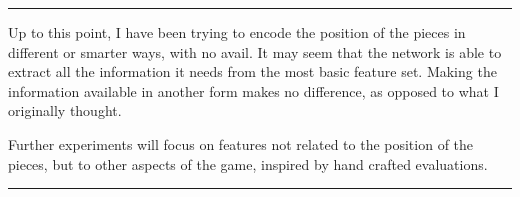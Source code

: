 



\noindent\rule{\textwidth}{1pt}

\vspace{0.2cm}
Up to this point, I have been trying to encode the position of the pieces in different or smarter ways, with no avail. It may seem that the network is able to extract all the information it needs from the most basic  feature set. Making the information available in another form makes no difference, as opposed to what I originally thought.

Further experiments will focus on features not related to the position of the pieces, but to other aspects of the game, inspired by hand crafted evaluations.

\noindent\rule{\textwidth}{1pt}








